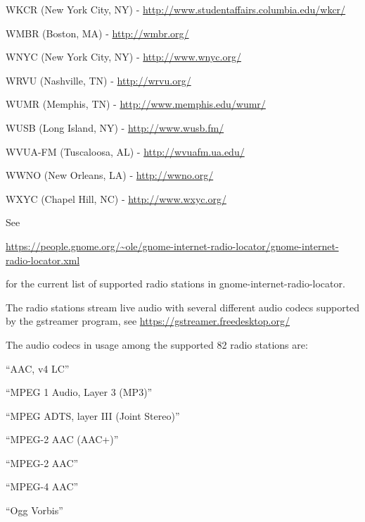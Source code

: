 \documentclass[20pt,landscape]{foils}
\begin{document}
\begin{list1}
\begin{list2}
  \item WKCR (New York City, NY) - \url{http://www.studentaffairs.columbia.edu/wkcr/}
  \item WMBR (Boston, MA) - \url{http://wmbr.org/}
  \item WNYC (New York City, NY) - \url{http://www.wnyc.org/}
  \item WRVU (Nashville, TN) - \url{http://wrvu.org/}
  \item WUMR (Memphis, TN) - \url{http://www.memphis.edu/wumr/}
  \item WUSB (Long Island, NY) - \url{http://www.wusb.fm/}
  \item WVUA-FM (Tuscaloosa, AL) - \url{http://wvuafm.ua.edu/}
  \item WWNO (New Orleans, LA) - \url{http://wwno.org/}
  \item WXYC (Chapel Hill, NC) - \url{http://www.wxyc.org/}
  \end{list2}
\end{list1}

See
\begin{tiny}\url{https://people.gnome.org/~ole/gnome-internet-radio-locator/gnome-internet-radio-locator.xml}\end{tiny} for the current list of supported radio stations in gnome-internet-radio-locator.


The radio stations stream live audio with several different audio codecs supported by the gstreamer program, see \url{https://gstreamer.freedesktop.org/}

The audio codecs in usage among the supported 82 radio stations are:

\begin{list1}
  \item
    \begin{list2}
    \item ``AAC, v4 LC''
    \item ``MPEG 1 Audio, Layer 3 (MP3)''
    \item ``MPEG ADTS, layer III (Joint Stereo)''
    \item ``MPEG-2 AAC (AAC+)''
    \item ``MPEG-2 AAC''
    \item ``MPEG-4 AAC''
    \item ``Ogg Vorbis''
    \end{list2}
\end{list1}

\end{document}
